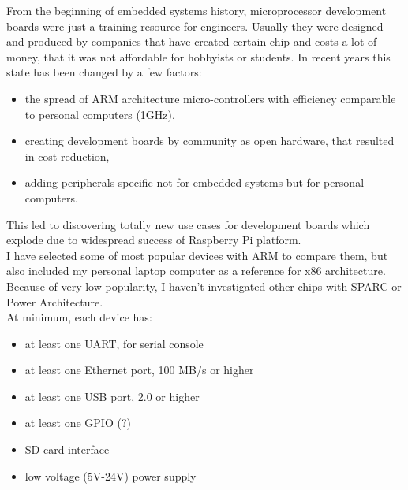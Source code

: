 \documentclass[printmode]{mgr}
\begin{document}
From the beginning of embedded systems history, microprocessor development boards were just a training resource for engineers.
Usually they were designed and produced by companies that have created certain chip and costs a lot of money, that it was not affordable for hobbyists or students.
In recent years this state has been changed by a few factors:
\begin{itemize}
  \item the spread of ARM architecture micro-controllers with efficiency comparable to personal computers (1GHz),
  \item creating development boards by community as open hardware, that resulted in cost reduction,
  \item adding peripherals specific not for embedded systems but for personal computers.
\end{itemize}
This led to discovering totally new use cases for development boards which explode due to widespread success of Raspberry Pi platform. \\
I have selected some of most popular devices with ARM to compare them, but also included my personal laptop computer as a reference for x86 architecture. Because of very low popularity, I  haven't investigated other chips with SPARC or Power Architecture. \\

At minimum, each device has:
\begin{itemize}
  \item at least one UART, for serial console
  \item at least one Ethernet port, 100 MB/s or higher
  \item at least one USB port, 2.0 or higher
  \item at least one GPIO (?)
  \item SD card interface
  \item low voltage (5V-24V) power supply
\end{itemize}
\end{document}
